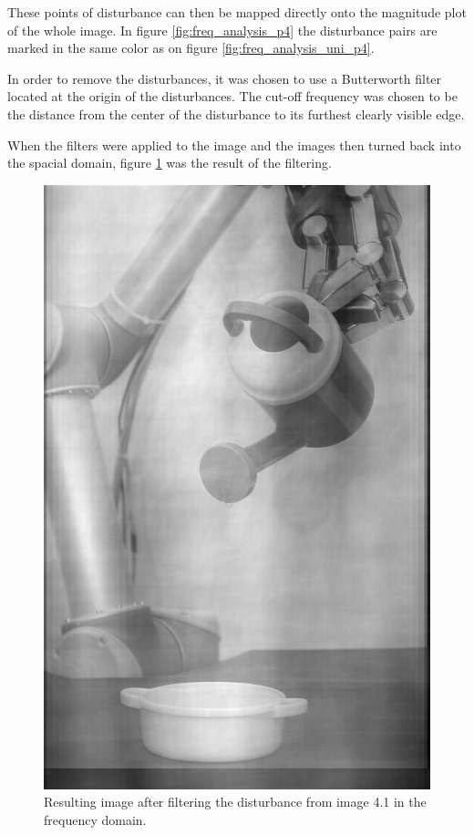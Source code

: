 These points of disturbance can then be mapped directly onto the magnitude plot of the whole image.
In figure \ref{fig:freq_analysis_p4} the disturbance pairs are marked in the same color as on figure  \ref{fig:freq_analysis_uni_p4}.


In order to remove the disturbances, it was chosen to use a Butterworth filter located at the origin of the disturbances.
The cut-off frequency was chosen to be the distance from the center of the disturbance to its furthest clearly visible edge.

When the filters were applied to the image and the images then turned back into the spacial domain, figure \ref{fig:result_04} was the result of the filtering.


\begin{figure}[H]
\centering
\includegraphics[width = 0.9 \linewidth]{../code/images/image_result_04.png}
\caption{Resulting image after filtering the disturbance from image 4.1 in the frequency domain.}
\label{fig:result_04}
\end{figure}

